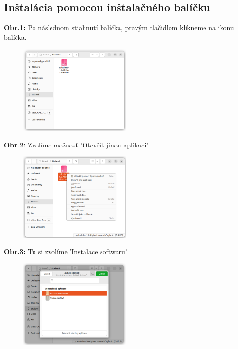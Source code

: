 \documentclass[11pt, a4paper]{article}
\begin{document}
\subsection{Inštalácia pomocou inštalačného balíčku}
\textbf{Obr.1:} Po následnom stiahnutí balíčka, pravým tlačidlom klikneme na ikonu balíčka. 
\begin{figure}[H]
    \centering
    \includegraphics[width=0.5\textwidth]{1.png} 
    \label{fig:i1} 
\end{figure}
\noindent \textbf{Obr.2:} Zvolíme možnosť 'Otevřít jinou aplikaci'
\begin{figure}[H]
    \centering
    \includegraphics[width=0.5\textwidth]{2.png}
    \label{fig:i2}
\end{figure}
\newpage
\noindent \textbf{Obr.3:} Tu si zvolíme 'Instalace softwaru'
\begin{figure}[H]
    \centering
    \includegraphics[width=0.5\textwidth]{3.png}
    \label{fig:i3}
\end{figure}
\end{document}

